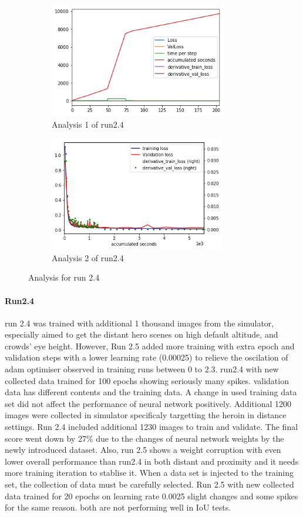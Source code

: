 \documentclass[paper=a4, fontsize=11pt]{scrartcl} %
\numberwithin{equation}{section} %
\numberwithin{figure}{section} %
\numberwithin{table}{section} %
\begin{document}
\begin{figure}	
	\begin{subfigure}{0.45\textwidth}
	\includegraphics[width=0.9\linewidth, height=5cm]{./imgs/analysis_0_2_4.png} 
	\caption{Analysis 1 of run2.4}
	\label{fig:subAnalysisRun24}
	\end{subfigure}
	\begin{subfigure}{0.45\textwidth}
	\includegraphics[width=0.9\linewidth, height=5cm]{./imgs/analysis_0_2_4plot.png}
	\caption{Analysis 2 of run2.4}
	\label{fig:subAnalysisRun24plot}
	\end{subfigure}
	 
	\caption{Analysis for run 2.4}
	\label{fig:AnalysisRun24}
 \end{figure}
 \paragraph{Run2.4}
 run 2.4 was trained with additional 1 thousand images from the simulator, especially aimed to get the distant hero scenes on high default altitude, and crowds' eye height. However, Run 2.5 added more training with extra epoch and validation steps with a lower learning rate (0.00025) to relieve the oscilation of adam optimiser observed in training runs between 0 to 2.3. run2.4 with new collected data trained for 100 epochs showing seriously many spikes. validation data has different contents and the training data. 
 A change in used training data set did not affect the performance of neural network positively. Additional 1200 images were collected in simulator specificaly targetting the heroin in distance settings. Run 2.4 included additional 1230 images to train and validate. The final score went down by 27\% due to the changes of neural network weights by the newly introduced dataset. Also, run 2.5 shows a weight corruption with even lower overall performance than run2.4 in both distant and proximity and it needs more training iteration to stablise it. When a data set is injected to the training set, the collection of data must be carefully selected.
 Run 2.5 with new collected data trained for 20 epochs on learning rate 0.0025 slight changes and some spikes for the same reason. 
 both are not performing well in IoU tests.
\end{document}
